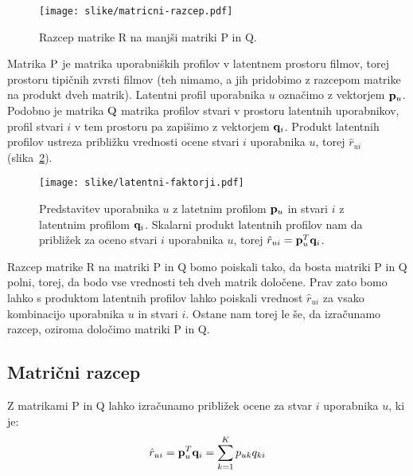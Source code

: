 \begin{figure}[htbp]
\begin{center}
\texttt{[image: slike/matricni-razcep.pdf]}
\caption{Razcep matrike R na manjši matriki P in Q.}
\label{f:matricni-razcep}
\end{center}
\end{figure}

Matrika $\rm P$ je matrika uporabniških profilov v latentnem prostoru filmov, torej prostoru tipičnih zvrsti filmov (teh nimamo, a jih pridobimo z razcepom matrike na produkt dveh matrik). Latentni profil uporabnika $u$ označimo z vektorjem ${\bf p}_u$. Podobno je matrika $\rm Q$ matrika profilov stvari v prostoru latentnih uporabnikov, profil stvari $i$ v tem prostoru pa zapišimo z vektorjem ${\bf q}_i$. Produkt latentnih profilov ustreza približku vrednosti ocene stvari $i$ uporabnika $u$, torej $\hat{r}_{ui}$ (slika~\ref{f:latentni-faktorji}).

\begin{figure}[htbp]
\begin{center}
\texttt{[image: slike/latentni-faktorji.pdf]}
\caption{Predstavitev uporabnika $u$ z latetnim profilom ${\bf p}_u$ in stvari $i$ z latentnim profilom ${\bf q}_i$. Skalarni produkt latentnih profilov nam da približek za oceno stvari $i$ uporabnika $u$, torej $\hat{r}_{ui}={\bf p}_u^T {\bf q}_i$.}
\label{f:latentni-faktorji}
\end{center}
\end{figure}

Razcep matrike R na matriki P in Q bomo poiskali tako, da bosta matriki P in Q polni, torej, da bodo vse vrednosti teh dveh matrik določene. Prav zato bomo lahko s produktom latentnih profilov lahko poiskali vrednost $\hat{r}_{ui}$ za vsako kombinacijo uporabnika $u$ in stvari $i$. Ostane nam torej le še, da izračunamo razcep, oziroma določimo matriki P in Q.

\subsection{Matrični razcep}

Z matrikami P in Q lahko izračunamo približek ocene za stvar $i$ uporabnika $u$, ki je:
%
\begin{equation}\label{eq:rui-latent}
  \hat{r}_{ui}={\bf p}_u^T {\bf q}_i = \sum_{k=1}^K p_{uk} q_{ki}
\end{equation}

